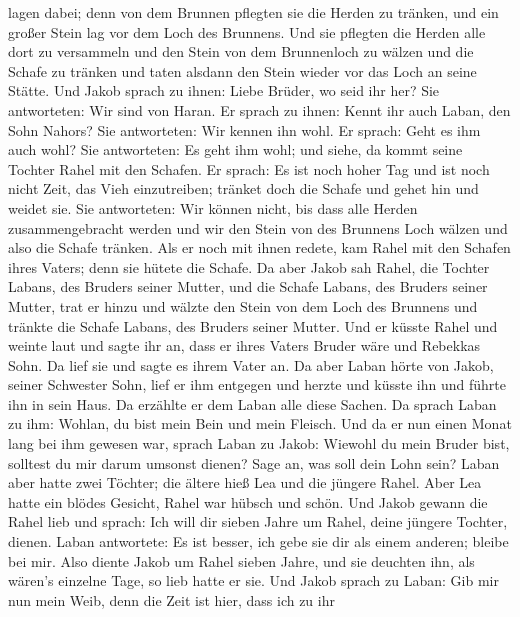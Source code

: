 lagen dabei; denn von dem Brunnen pflegten sie die Herden zu tränken,
und ein großer Stein lag vor dem Loch des Brunnens.  Und
sie pflegten die Herden alle dort zu versammeln und den Stein von dem
Brunnenloch zu wälzen und die Schafe zu tränken und taten alsdann den
Stein wieder vor das Loch an seine Stätte.  Und Jakob
sprach zu ihnen: Liebe Brüder, wo seid ihr her? Sie antworteten: Wir
sind von Haran.  Er sprach zu ihnen: Kennt ihr auch Laban,
den Sohn Nahors? Sie antworteten: Wir kennen ihn wohl.  Er
sprach: Geht es ihm auch wohl? Sie antworteten: Es geht ihm wohl; und
siehe, da kommt seine Tochter Rahel mit den Schafen.  Er
sprach: Es ist noch hoher Tag und ist noch nicht Zeit, das Vieh
einzutreiben; tränket doch die Schafe und gehet hin und weidet sie.
 Sie antworteten: Wir können nicht, bis dass alle Herden
zusammengebracht werden und wir den Stein von des Brunnens Loch wälzen
und also die Schafe tränken.  Als er noch mit ihnen
redete, kam Rahel mit den Schafen ihres Vaters; denn sie hütete die
Schafe.  Da aber Jakob sah Rahel, die Tochter Labans, des
Bruders seiner Mutter, und die Schafe Labans, des Bruders seiner Mutter,
trat er hinzu und wälzte den Stein von dem Loch des Brunnens und tränkte
die Schafe Labans, des Bruders seiner Mutter.  Und er
küsste Rahel und weinte laut  und sagte ihr an, dass er
ihres Vaters Bruder wäre und Rebekkas Sohn. Da lief sie und sagte es
ihrem Vater an.  Da aber Laban hörte von Jakob, seiner
Schwester Sohn, lief er ihm entgegen und herzte und küsste ihn und
führte ihn in sein Haus. Da erzählte er dem Laban alle diese Sachen.
 Da sprach Laban zu ihm: Wohlan, du bist mein Bein und
mein Fleisch. Und da er nun einen Monat lang bei ihm gewesen war,
 sprach Laban zu Jakob: Wiewohl du mein Bruder bist,
solltest du mir darum umsonst dienen? Sage an, was soll dein Lohn sein?
 Laban aber hatte zwei Töchter; die ältere hieß Lea und
die jüngere Rahel.  Aber Lea hatte ein blödes Gesicht,
Rahel war hübsch und schön.  Und Jakob gewann die Rahel
lieb und sprach: Ich will dir sieben Jahre um Rahel, deine jüngere
Tochter, dienen.  Laban antwortete: Es ist besser, ich
gebe sie dir als einem anderen; bleibe bei mir.  Also
diente Jakob um Rahel sieben Jahre, und sie deuchten ihn, als wären's
einzelne Tage, so lieb hatte er sie.  Und Jakob sprach zu
Laban: Gib mir nun mein Weib, denn die Zeit ist hier, dass ich zu ihr
